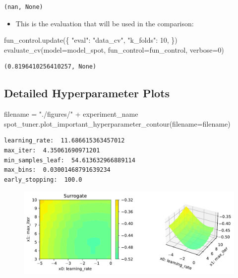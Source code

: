 \documentclass[
  letterpaper,
  DIV=11,
  numbers=noendperiod]{scrreprt}
\newenvironment{Shaded}{\begin{snugshade}}{\end{snugshade}}
\newcommand{\DecValTok}[1]{\textcolor[rgb]{0.68,0.00,0.00}{#1}}
\newcommand{\NormalTok}[1]{\textcolor[rgb]{0.00,0.23,0.31}{#1}}
\newcommand{\OperatorTok}[1]{\textcolor[rgb]{0.37,0.37,0.37}{#1}}
\newcommand{\StringTok}[1]{\textcolor[rgb]{0.13,0.47,0.30}{#1}}
\providecommand{\tightlist}{%
  \setlength{\itemsep}{0pt}\setlength{\parskip}{0pt}}\usepackage{longtable,booktabs,array}
\begin{document}
\begin{verbatim}
(nan, None)
\end{verbatim}

\begin{itemize}
\tightlist
\item
  This is the evaluation that will be used in the comparison:
\end{itemize}

\begin{Shaded}
\begin{Highlighting}[]
\NormalTok{fun\_control.update(\{}
     \StringTok{"eval"}\NormalTok{: }\StringTok{"data\_cv"}\NormalTok{,}
     \StringTok{"k\_folds"}\NormalTok{: }\DecValTok{10}\NormalTok{,}
\NormalTok{\})}
\NormalTok{evaluate\_cv(model}\OperatorTok{=}\NormalTok{model\_spot, fun\_control}\OperatorTok{=}\NormalTok{fun\_control, verbose}\OperatorTok{=}\DecValTok{0}\NormalTok{)}
\end{Highlighting}
\end{Shaded}

\begin{verbatim}
(0.8196410256410257, None)
\end{verbatim}

\hypertarget{detailed-hyperparameter-plots-4}{%
\subsection{Detailed Hyperparameter
Plots}\label{detailed-hyperparameter-plots-4}}

\begin{Shaded}
\begin{Highlighting}[]
\NormalTok{filename }\OperatorTok{=} \StringTok{"./figures/"} \OperatorTok{+}\NormalTok{ experiment\_name}
\NormalTok{spot\_tuner.plot\_important\_hyperparameter\_contour(filename}\OperatorTok{=}\NormalTok{filename)}
\end{Highlighting}
\end{Shaded}

\begin{verbatim}
learning_rate:  11.686615363457012
max_iter:  4.35061690971201
min_samples_leaf:  54.613632966889114
max_bins:  0.03001468791639234
early_stopping:  100.0
\end{verbatim}

\begin{figure}[H]

{\centering \includegraphics{17_spot_hpt_sklearn_multiclass_classification_xgb_files/figure-pdf/cell-46-output-2.pdf}

}

\end{figure}
\end{document}
